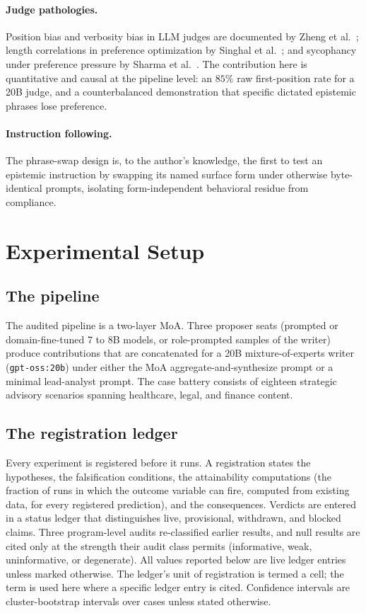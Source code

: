 \documentclass[11pt]{article}
\begin{document}
\paragraph{Judge pathologies.} Position bias and verbosity bias in LLM
judges are documented by Zheng et al.\ \cite{zheng2023judging}; length
correlations in preference optimization by Singhal et al.\
\cite{singhal2023length}; and sycophancy under preference pressure by
Sharma et al.\ \cite{sharma2023sycophancy}. The contribution here is
quantitative and causal at the pipeline level: an $85\%$ raw
first-position rate for a 20B judge, and a counterbalanced
demonstration that specific dictated epistemic phrases lose preference.

\paragraph{Instruction following.} The phrase-swap design is, to the
author's knowledge, the first to test an epistemic instruction by
swapping its named surface form under otherwise byte-identical prompts,
isolating form-independent behavioral residue from compliance.

\section{Experimental Setup}
\label{sec:setup}

\subsection{The pipeline}

The audited pipeline is a two-layer MoA. Three proposer seats
(prompted or domain-fine-tuned 7 to 8B models, or role-prompted samples
of the writer) produce contributions that are concatenated for a 20B
mixture-of-experts writer (\texttt{gpt-oss:20b}) under either the MoA
aggregate-and-synthesize prompt or a minimal lead-analyst prompt. The
case battery consists of eighteen strategic advisory scenarios spanning
healthcare, legal, and finance content.

\subsection{The registration ledger}

Every experiment is registered before it runs. A registration states
the hypotheses, the falsification conditions, the attainability
computations (the fraction of runs in which the outcome variable can
fire, computed from existing data, for every registered prediction),
and the consequences. Verdicts are entered in a status ledger that
distinguishes live, provisional, withdrawn, and blocked claims. Three
program-level audits re-classified earlier results, and null results
are cited only at the strength their audit class permits (informative,
weak, uninformative, or degenerate). All values reported below are live
ledger entries unless marked otherwise. The ledger's unit of
registration is termed a cell; the term is used here where a specific
ledger entry is cited. Confidence intervals are cluster-bootstrap
intervals over cases unless stated otherwise.
\end{document}

